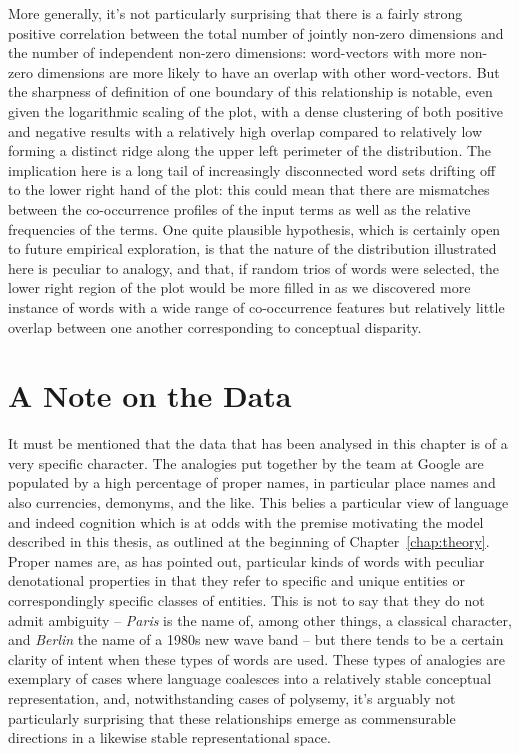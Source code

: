 More generally, it's not particularly surprising that there is a fairly strong positive correlation between the total number of jointly non-zero dimensions and the number of independent non-zero dimensions: word-vectors with more non-zero dimensions are more likely to have an overlap with other word-vectors.  But the sharpness of definition of one boundary of this relationship is notable, even given the logarithmic scaling of the plot, with a dense clustering of both positive and negative results with a relatively high overlap compared to relatively low forming a distinct ridge along the upper left perimeter of the distribution.  The implication here is a long tail of increasingly disconnected word sets drifting off to the lower right hand of the plot: this could mean that there are mismatches between the co-occurrence profiles of the input terms as well as the relative frequencies of the terms.  One quite plausible hypothesis, which is certainly open to future empirical exploration, is that the nature of the distribution illustrated here is peculiar to analogy, and that, if random trios of words were selected, the lower right region of the plot would be more filled in as we discovered more instance of words with a wide range of co-occurrence features but relatively little overlap between one another corresponding to conceptual disparity.

\section{A Note on the Data}
It must be mentioned that the data that has been analysed in this chapter is of a very specific character.  The analogies put together by the team at Google are populated by a high percentage of proper names, in particular place names and also currencies, demonyms, and the like.  This belies a particular view of language and indeed cognition which is at odds with the premise motivating the model described in this thesis, as outlined at the beginning of Chapter~\ref{chap:theory}.  Proper names are, as \cite{Russell1905} has pointed out, particular kinds of words with peculiar denotational properties in that they refer to specific and unique entities or correspondingly specific classes of entities.  This is not to say that they do not admit ambiguity -- \emph{Paris} is the name of, among other things, a classical character, and \emph{Berlin} the name of a 1980s new wave band -- but there tends to be a certain clarity of intent when these types of words are used.  These types of analogies are exemplary of cases where language coalesces into a relatively stable conceptual representation, and, notwithstanding cases of polysemy, it's arguably not particularly surprising that these relationships emerge as commensurable directions in a likewise stable representational space.

